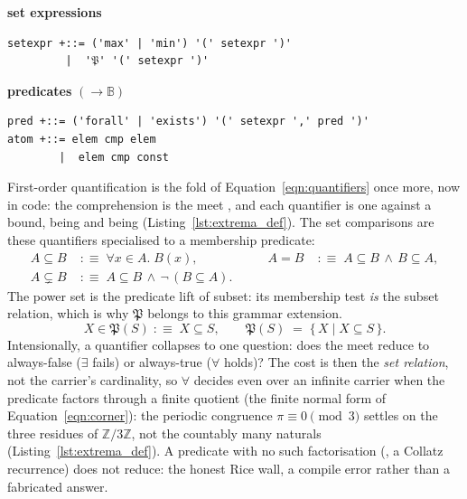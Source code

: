 \documentclass[11pt, a4paper]{article}
\begin{document}
\begin{listing}[htbp]
\vspace{0.6em}
\noindent
\begin{minipage}[t]{0.49\linewidth}
{\footnotesize\centering\textbf{set expressions}\par}
\begin{verbatim}
setexpr +::= ('max' | 'min') '(' setexpr ')'
         |  '𝔓' '(' setexpr ')'
\end{verbatim}
\end{minipage}\hfill
\begin{minipage}[t]{0.49\linewidth}
{\footnotesize\centering\textbf{predicates} \ensuremath{(\to \mathbb{B})}\par}
\begin{verbatim}
pred +::= ('forall' | 'exists') '(' setexpr ',' pred ')'
atom +::= elem cmp elem
        |  elem cmp const
\end{verbatim}
\end{minipage}
\end{listing}

First-order quantification is the fold of Equation~\ref{eqn:quantifiers} once more, now in code: the comprehension is the meet , and each quantifier is one  against a bound,  being  and  being  (Listing~\ref{lst:extrema_def}).
The set comparisons are these quantifiers specialised to a membership predicate:
\begin{equation}
\label{eqn:inclusion}
\begin{aligned}
A \subseteq B &\;:\equiv\; \forall x \in A.\; B(x), &\qquad
A = B &\;:\equiv\; A \subseteq B \,\wedge\, B \subseteq A,\\
A \subsetneq B &\;:\equiv\; A \subseteq B \,\wedge\, \neg\,(B \subseteq A).
\end{aligned}
\end{equation}
The power set is the predicate lift of subset: its membership test \emph{is} the subset relation, which is why $\mathfrak{P}$ belongs to this grammar extension.
\begin{equation}
\label{eqn:powerset}
X \in \mathfrak{P}(S) \;:\equiv\; X \subseteq S, \qquad
\mathfrak{P}(S) \;=\; \{\, X \mid X \subseteq S \,\}.
\end{equation}
Intensionally, a quantifier collapses to one question: does the meet  reduce to always-false ($\exists$ fails) or always-true ($\forall$ holds)?
The cost is then the \emph{set relation}, not the carrier's cardinality, so $\forall$ decides even over an infinite carrier when the predicate factors through a finite quotient (the finite normal form of Equation~\ref{eqn:corner}): the periodic congruence $\pi \equiv 0 \pmod 3$ settles on the three residues of $\mathbb{Z}/3\mathbb{Z}$, not the countably many naturals (Listing~\ref{lst:extrema_def}).
A predicate with no such factorisation (, a Collatz recurrence) does not reduce: the honest Rice wall, a compile error rather than a fabricated answer.
\end{document}
